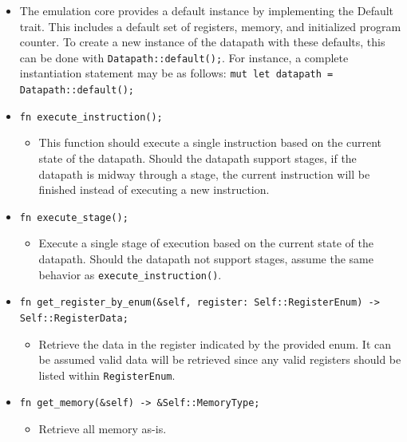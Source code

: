 \documentclass[
    paper=letter,
    parskip=half,
    fontsize=12pt,
    titlepage=firstiscover,
    toc=bibliography,
    numbers=endperiod
]{scrartcl}
\providecommand{\tightlist}{%
  \setlength{\itemsep}{0pt}\setlength{\parskip}{0pt}}
\begin{document}
\begin{itemize}
\begin{itemize}
        \item The emulation core provides a default instance by implementing the
            Default trait. This includes a default set of registers, memory, and
            initialized program counter. To create a new instance of the
            datapath with these defaults, this can be done with
            \texttt{Datapath::default();}. For instance, a complete instantiation
            statement may be as follows: \texttt{mut let datapath = Datapath::default();}
        \item \texttt{fn execute\_instruction();}
        \begin{itemize}
            \tightlist
            \item This function should execute a single instruction based on the
            current state of the datapath. Should the datapath support stages,
            if the datapath is midway through a stage, the current instruction
            will be finished instead of executing a new instruction.
        \end{itemize}
        \item \texttt{fn execute\_stage();}
        \begin{itemize}
            \tightlist
            \item Execute a single stage of execution based on the current state of
            the datapath. Should the datapath not support stages, assume the
            same behavior as \texttt{execute\_instruction()}.
        \end{itemize}
        \item \texttt{fn get\_register\_by\_enum(\&self, register: Self::RegisterEnum) -\textgreater{} Self::RegisterData;}
        \begin{itemize}
            \tightlist
            \item Retrieve the data in the register indicated by the provided enum.
            It can be assumed valid data will be retrieved since any valid
            registers should be listed within \texttt{RegisterEnum}.
        \end{itemize}
        \item \texttt{fn get\_memory(\&self) -\textgreater{} \&Self::MemoryType;}
        \begin{itemize}
            \tightlist
            \item Retrieve all memory as-is.
        \end{itemize}
    \end{itemize}


\end{itemize}
\end{document}
